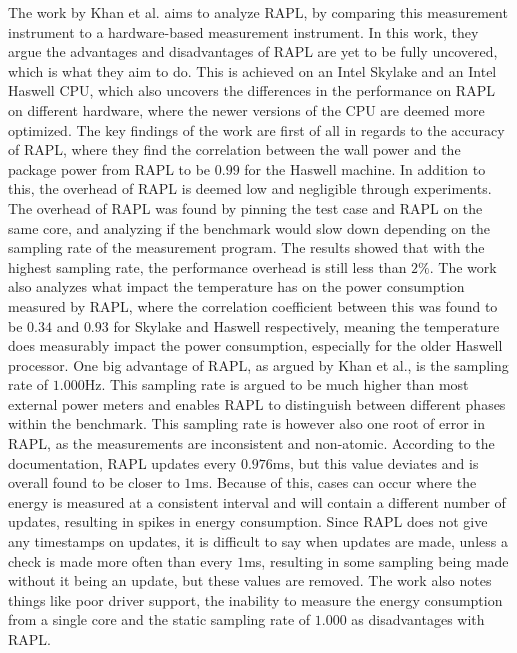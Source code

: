The work by Khan et al.\cite[]{RAPL_in_action} aims to analyze RAPL, by comparing this measurement instrument to a hardware-based measurement instrument. In this work, they argue the advantages and disadvantages of RAPL are yet to be fully uncovered, which is what they aim to do. This is achieved on an Intel Skylake and an Intel Haswell CPU, which also uncovers the differences in the performance on RAPL on different hardware, where the newer versions of the CPU are deemed more optimized. The key findings of the work are first of all in regards to the accuracy of RAPL, where they find the correlation between the wall power and the package power from RAPL to be $0.99$ for the Haswell machine. In addition to this, the overhead of RAPL is deemed low and negligible through experiments. The overhead of RAPL was found by pinning the test case and RAPL on the same core, and analyzing if the benchmark would slow down depending on the sampling rate of the measurement program. The results showed that with the highest sampling rate, the performance overhead is still less than $2\%$. The work also analyzes what impact the temperature has on the power consumption measured by RAPL, where the correlation coefficient between this was found to be $0.34$ and $0.93$ for Skylake and Haswell respectively, meaning the temperature does measurably impact the power consumption, especially for the older Haswell processor. One big advantage of RAPL, as argued by Khan et al.\cite[]{RAPL_in_action}, is the sampling rate of $1.000$Hz. This sampling rate is argued to be much higher than most external power meters and enables RAPL to distinguish between different phases within the benchmark. This sampling rate is however also one root of error in RAPL, as the measurements are inconsistent and non-atomic. According to the documentation, RAPL updates every $0.976$ms, but this value deviates and is overall found to be closer to $1$ms. Because of this, cases can occur where the energy is measured at a consistent interval and will contain a different number of updates, resulting in spikes in energy consumption. Since RAPL does not give any timestamps on updates, it is difficult to say when updates are made, unless a check is made more often than every $1$ms, resulting in some sampling being made without it being an update, but these values are removed. The work\cite[]{RAPL_in_action} also notes things like poor driver support, the inability to measure the energy consumption from a single core and the static sampling rate of $1.000$ as disadvantages with RAPL.\cite{RAPL_in_action}\nytafsnit

